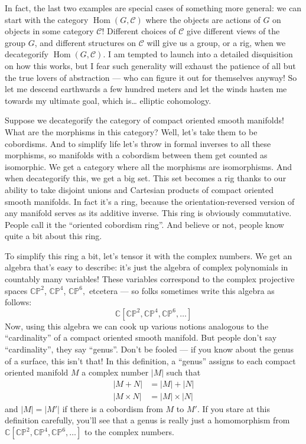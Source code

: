 \documentclass{article}
\begin{document}
In fact, the last two examples are special cases of something more
general: we can start with the category
\(\operatorname{Hom}(G,\mathcal{C})\) where the objects are actions of
\(G\) on objects in some category \(\mathcal{C}\)! Different choices of
\(\mathcal{C}\) give different views of the group \(G\), and different
structures on \(\mathcal{C}\) will give us a group, or a rig, when we
decategorify \(\operatorname{Hom}(G,\mathcal{C})\). I am tempted to
launch into a detailed disquisition on how this works, but I fear such
generality will exhaust the patience of all but the true lovers of
abstraction --- who can figure it out for themselves anyway! So let me
descend earthwards a few hundred meters and let the winds hasten me
towards my ultimate goal, which is\ldots{} elliptic cohomology.

Suppose we decategorify the category of compact oriented smooth
manifolds! What are the morphisms in this category? Well, let's take
them to be cobordisms. And to simplify life let's throw in formal
inverses to all these morphisms, so manifolds with a cobordism between
them get counted as isomorphic. We get a category where all the
morphisms are isomorphisms. And when decategorify this, we get a big
set. This set becomes a rig thanks to our ability to take disjoint
unions and Cartesian products of compact oriented smooth manifolds. In
fact it's a ring, because the orientation-reversed version of any
manifold serves as its additive inverse. This ring is obviously
commutative. People call it the ``oriented cobordism ring''. And believe
or not, people know quite a bit about this ring.

To simplify this ring a bit, let's tensor it with the complex numbers.
We get an algebra that's easy to describe: it's just the algebra of
complex polynomials in countably many variables! These variables
correspond to the complex projective spaces \(\mathbb{CP}^2\),
\(\mathbb{CP}^4\), \(\mathbb{CP}^6,\) etcetera --- so folks sometimes
write this algebra as follows:
\[\mathbb{C}[\mathbb{CP}^2,\mathbb{CP}^4,\mathbb{CP}^6,\ldots]\] Now,
using this algebra we can cook up various notions analogous to the
``cardinality'' of a compact oriented smooth manifold. But people don't
say ``cardinality'', they say ``genus''. Don't be fooled --- if you know
about the genus of a surface, this isn't that! In this definition, a
``genus'' assigns to each compact oriented manifold \(M\) a complex
number \(|M|\) such that \[
  \begin{aligned}
    |M + N| &= |M| + |N|
  \\|M \times N| &= |M| \times |N|
  \end{aligned}
\] and \(|M| = |M'|\) if there is a cobordism from \(M\) to \(M'\). If
you stare at this definition carefully, you'll see that a genus is
really just a homomorphism from
\(\mathbb{C}[\mathbb{CP}^2,\mathbb{CP}^4,\mathbb{CP}^6,\ldots]\) to the
complex numbers.
\end{document}
